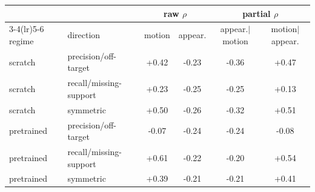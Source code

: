 \begin{tabular}{llcccc}
\toprule
& & \multicolumn{2}{c}{raw $\rho$} & \multicolumn{2}{c}{partial $\rho$} \\
\cmidrule(lr){3-4}\cmidrule(lr){5-6}
regime & direction & motion & appear. & appear.$\mid$motion & motion$\mid$appear. \\
\midrule
scratch & precision/off-target & +0.42 & -0.23 & -0.36 & +0.47 \\
scratch & recall/missing-support & +0.23 & -0.25 & -0.25 & +0.13 \\
scratch & symmetric & +0.50 & -0.26 & -0.32 & +0.51 \\
pretrained & precision/off-target & -0.07 & -0.24 & -0.24 & -0.08 \\
pretrained & recall/missing-support & +0.61 & -0.22 & -0.20 & +0.54 \\
pretrained & symmetric & +0.39 & -0.21 & -0.21 & +0.41 \\
\bottomrule
\end{tabular}
